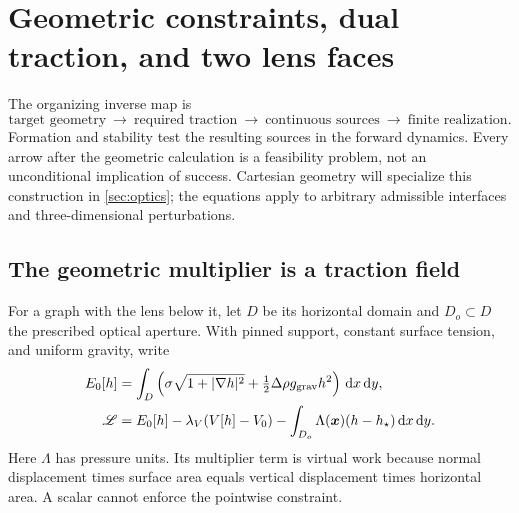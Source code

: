 \section{Geometric constraints, dual traction, and two lens faces}
\label{sec:geometric-inverse}

The organizing inverse map is
\[
 \text{target geometry}\ \longrightarrow\ \text{required traction}
 \ \longrightarrow\ \text{continuous sources}
 \ \longrightarrow\ \text{finite realization}.
\]
Formation and stability test the resulting sources in the forward dynamics.
Every arrow after the geometric calculation is a feasibility problem, not an
unconditional implication of success. Cartesian geometry will specialize this
construction in \cref{sec:optics}; the equations apply to arbitrary admissible
interfaces and three-dimensional perturbations.

\subsection{The geometric multiplier is a traction field}
For a graph with the lens below it, let $D$ be its horizontal domain and
$D_o\subset D$ the prescribed optical aperture. With pinned support, constant
surface tension, and uniform gravity, write
\begin{align}
 E_0[h]&=\int_D\left(\sigma\sqrt{1+|\nabla h|^2}
                       +\tfrac12\Delta\rho g_{\rm grav}h^2\right)\,\mathrm d x\,\mathrm d y,\\
 \mathscr L&=E_0[h]-\lambda_V(V[h]-V_0)
                -\int_{D_o}\Lambda(\bm x)(h-h_\star)\,\mathrm d x\,\mathrm d y.
 \label{eq:geometric-lagrangian}
\end{align}
Here $\Lambda$ has pressure units. Its multiplier term is virtual work because
normal displacement times surface area equals vertical displacement times
horizontal area. A scalar cannot enforce the pointwise constraint.

